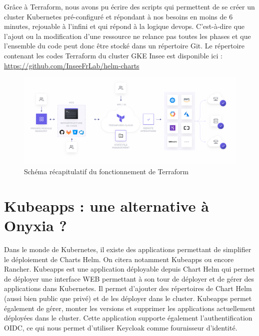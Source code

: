 \documentclass[11pt,fleqn]{book} %
\begin{document}
Grâce à Terraform, nous avons pu écrire des scripts qui permettent de se créer un cluster Kubernetes pré-configuré et répondant à nos besoins en moins de 6 minutes, rejouable à l'infini et qui répond à la logique devops. C'est-à-dire que l'ajout ou la modification d'une ressource ne relance pas toutes les phases et que l'ensemble du code peut donc être stocké dans un répertoire Git. Le répertoire contenant les codes Terraform du cluster GKE Insee est disponible ici : \url{https://github.com/InseeFrLab/helm-charts}

\begin{figure}[H]\centering
\renewcommand{\figurename}{Schéma}
\includegraphics[angle=90, scale=0.35]{Pictures/annexe/terraform-cloud.png}
\captionsetup{margin=1.5cm,format=hang,justification=justified}
\caption[]{Schéma récapitulatif du fonctionnement de Terraform \newline}
\end{figure}




\chapter{Kubeapps : une alternative à Onyxia ?}
\label{kubeapps}
\vspace{-2cm}
Dans le monde de Kubernetes, il existe des applications permettant de simplifier le déploiement de Charts Helm. On citera notamment Kubeapps ou encore Rancher. Kubeapps est une application déployable depuis Chart Helm qui permet de déployer une interface WEB permettant à son tour de déployer et de gérer des applications dans Kubernetes. Il permet d'ajouter des répertoires de Chart Helm (aussi bien public que privé) et de les déployer dans le cluster. Kubeapps permet également de gérer, monter les versions et supprimer les applications actuellement déployées dans le cluster. Cette application supporte également l'authentification OIDC, ce qui nous permet d'utiliser Keycloak comme fournisseur d'identité.
\end{document}
